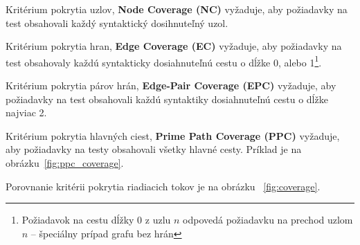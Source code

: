 \begin{description}
	\item Kritérium pokrytia uzlov, \textbf{Node Coverage (NC)} vyžaduje, aby požiadavky na test obsahovali každý syntaktický dosihnuteľný uzol.
	\item Kritérium pokrytia hran, \textbf{Edge Coverage (EC)} vyžaduje, aby požiadavky na test obsahovaly každú syntakticky dosiahnuteľnú cestu o dĺžke 0, alebo 1\footnote{Požiadavok na cestu dĺžky 0 z uzlu $n$ odpovedá požiadavku na prechod uzlom $n$ -- špeciálny prípad grafu bez hrán}.
	\item Kritérium pokrytia párov hrán, \textbf{Edge-Pair Coverage (EPC)} vyžaduje, aby požiadavky na test obsahovali každú syntaktiky dosiahnuteľnú cestu o dĺžke najviac 2.
	\item Kritérium pokrytia hlavných ciest, \textbf{Prime Path Coverage (PPC)} vyžaduje, aby požiadavky na testy obsahovali všetky hlavné cesty. Príklad je na obrázku~\ref{fig:ppc_coverage}.
\end{description}
Porovnanie kritérii pokrytia riadiacich tokov je na obrázku ~\ref{fig:coverage}.

